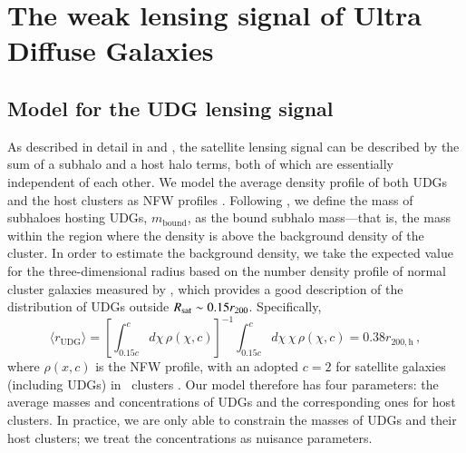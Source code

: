 \documentclass[usenatbib,fleqn]{mnras}
\begin{document}
\section{The weak lensing signal of Ultra Diffuse Galaxies}
\label{s:results}

\subsection{Model for the UDG lensing signal}

As described in detail in \cite{yang06} and \cite{sifon15_kids}, the satellite lensing signal can be described by the sum of a subhalo and a host halo terms, both of which are essentially independent of each other. We model the average density profile of both UDGs and the host clusters as NFW profiles \citep{nfw95}.
%
Following \cite{sifon17}, we define the mass of subhaloes hosting UDGs, $m_\mathrm{bound}$, as the bound subhalo mass---that is, the mass within the region where the density is above the background density of the cluster. In order to estimate the background density, we take the expected value for the three-dimensional radius based on the number density profile of normal cluster galaxies measured by \cite{vdburg15}, which provides a good description of the distribution of UDGs outside $R_\mathrm{sat}\sim0.15r_{200}$. Specifically,
\begin{equation}
 \langle r_\mathrm{UDG} \rangle = 
  \left[\int_{0.15c}^c d\chi\,\rho(\chi, c)\right]^{-1}
    \int_{0.15c}^c d\chi\,\chi\,\rho(\chi, c) = 0.38r_\mathrm{200,h}\,,
\end{equation}
where $\rho(x, c)$ is the NFW profile, with an adopted $c=2$ for satellite galaxies (including UDGs) in \meneacs\ clusters \citep{vdburg15,vdburg16}.
Our model therefore has four parameters: the average masses and concentrations of UDGs and the corresponding ones for host clusters. In practice, we are only able to constrain the masses of UDGs and their host clusters; we treat the concentrations as nuisance parameters.
\end{document}
